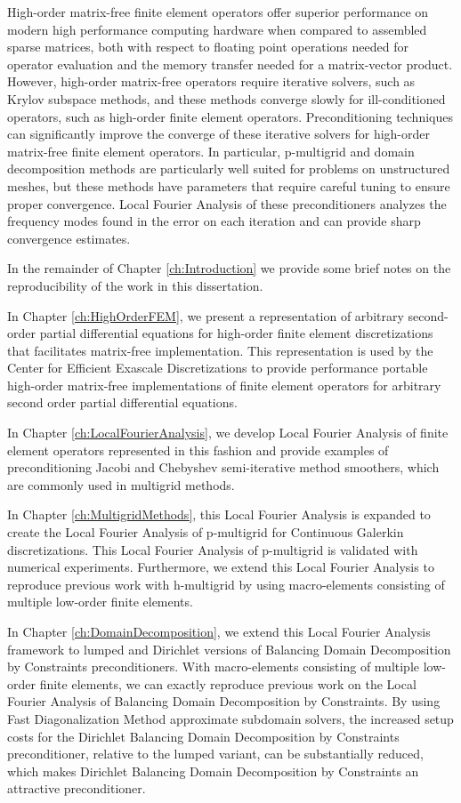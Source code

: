 High-order matrix-free finite element operators offer superior performance on modern high performance computing hardware when compared to assembled sparse matrices, both with respect to floating point operations needed for operator evaluation and the memory transfer needed for a matrix-vector product.
However, high-order matrix-free operators require iterative solvers, such as Krylov subspace methods, and these methods converge slowly for ill-conditioned operators, such as high-order finite element operators.
Preconditioning techniques can significantly improve the converge of these iterative solvers for high-order matrix-free finite element operators.
In particular, p-multigrid and domain decomposition methods are particularly well suited for problems on unstructured meshes, but these methods have parameters that require careful tuning to ensure proper convergence.
Local Fourier Analysis of these preconditioners analyzes the frequency modes found in the error on each iteration and can provide sharp convergence estimates.

In the remainder of Chapter \ref{ch:Introduction} we provide some brief notes on the reproducibility of the work in this dissertation.

In Chapter \ref{ch:HighOrderFEM}, we present a representation of arbitrary second-order partial differential equations for high-order finite element discretizations that facilitates matrix-free implementation.
This representation is used by the Center for Efficient Exascale Discretizations to provide performance portable high-order matrix-free implementations of finite element operators for arbitrary second order partial differential equations.

In Chapter \ref{ch:LocalFourierAnalysis}, we develop Local Fourier Analysis of finite element operators represented in this fashion and provide examples of preconditioning Jacobi and Chebyshev semi-iterative method smoothers, which are commonly used in multigrid methods.

In Chapter \ref{ch:MultigridMethods}, this Local Fourier Analysis is expanded to create the Local Fourier Analysis of p-multigrid for Continuous Galerkin discretizations.
This Local Fourier Analysis of p-multigrid is validated with numerical experiments.
Furthermore, we extend this Local Fourier Analysis to reproduce previous work with h-multigrid by using macro-elements consisting of multiple low-order finite elements.

In Chapter \ref{ch:DomainDecomposition}, we extend this Local Fourier Analysis framework to lumped and Dirichlet versions of Balancing Domain Decomposition by Constraints preconditioners.
With macro-elements consisting of multiple low-order finite elements, we can exactly reproduce previous work on the Local Fourier Analysis of Balancing Domain Decomposition by Constraints.
By using Fast Diagonalization Method approximate subdomain solvers, the increased setup costs for the Dirichlet Balancing Domain Decomposition by Constraints preconditioner, relative to the lumped variant, can be substantially reduced, which makes Dirichlet Balancing Domain Decomposition by Constraints an attractive preconditioner.

